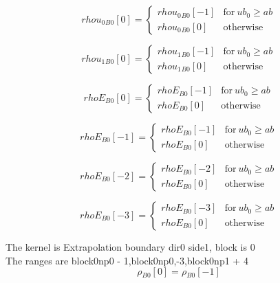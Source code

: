 \documentclass{article}
\begin{document}
\begin{dmath}{rhou_{0}{_{B0}}}[{0}] = \begin{cases} {rhou_{0}{_{B0}}}[{-1}] & \text{for}\: ub_{0} \geq ab \\{rhou_{0}{_{B0}}}[{0}] & \text{otherwise} \end{cases}\end{dmath}

\begin{dmath}{rhou_{1}{_{B0}}}[{0}] = \begin{cases} {rhou_{1}{_{B0}}}[{-1}] & \text{for}\: ub_{0} \geq ab \\{rhou_{1}{_{B0}}}[{0}] & \text{otherwise} \end{cases}\end{dmath}

\begin{dmath}{rhoE{_{B0}}}[{0}] = \begin{cases} {rhoE{_{B0}}}[{-1}] & \text{for}\: ub_{0} \geq ab \\{rhoE{_{B0}}}[{0}] & \text{otherwise} \end{cases}\end{dmath}

\begin{dmath}{rhoE{_{B0}}}[{-1}] = \begin{cases} {rhoE{_{B0}}}[{-1}] & \text{for}\: ub_{0} \geq ab \\{rhoE{_{B0}}}[{0}] & \text{otherwise} \end{cases}\end{dmath}

\begin{dmath}{rhoE{_{B0}}}[{-2}] = \begin{cases} {rhoE{_{B0}}}[{-2}] & \text{for}\: ub_{0} \geq ab \\{rhoE{_{B0}}}[{0}] & \text{otherwise} \end{cases}\end{dmath}

\begin{dmath}{rhoE{_{B0}}}[{-3}] = \begin{cases} {rhoE{_{B0}}}[{-3}] & \text{for}\: ub_{0} \geq ab \\{rhoE{_{B0}}}[{0}] & \text{otherwise} \end{cases}\end{dmath}

\noindent The kernel is Extrapolation boundary dir0 side1, block is 0\\\noindent The ranges are block0np0 - 1,block0np0,-3,block0np1 + 4\\\begin{dmath}{\rho{_{B0}}}[{0}] = {\rho{_{B0}}}[{-1}]\end{dmath}
\end{document}
